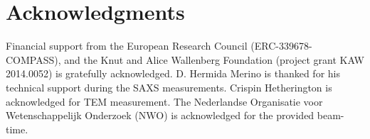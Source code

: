 \documentclass[aps,prl,preprint,superscriptaddress]{revtex4-1} %
\begin{document}
\section{Acknowledgments}
Financial support from the European Research Council (ERC-339678-COMPASS), and the Knut and Alice Wallenberg Foundation (project grant KAW 2014.0052) is gratefully acknowledged. D. Hermida Merino is thanked for his technical support during the SAXS measurements. Crispin Hetherington is acknowledged for TEM measurement. The Nederlandse Organisatie voor Wetenschappelijk Onderzoek (NWO) is acknowledged for the provided beam-time.


%
%

%



\end{document}
